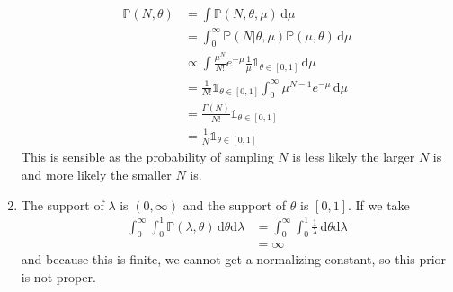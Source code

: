 \documentclass[letterpaper,10pt]{amsart}
\newcommand{\rmd}{\mathrm{d}}
\newcommand{\p}[1]{\mathbb{P}\!\left(#1\right)}
\begin{document}
\begin{enumerate}[{1}.1]
\begin{align*}
\p{N, \theta} &= \int \! \p{N, \theta, \mu} \, \rmd \mu \\
&= \int_0^\infty \! \p{N | \theta, \mu} \p{\mu, \theta} \, \rmd \mu \\
&\propto \int \! \frac{\mu^N}{N!}e^{-\mu} \frac{1}{\mu}  \mathds{1}_{\theta \in [0,1]} \, \rmd \mu\\
&= \frac{1}{N!} \mathds{1}_{\theta \in [0,1]} \int_0^\infty \! \mu^{N-1} e^{-\mu} \, \rmd \mu\\
&= \frac{\Gamma(N)}{N!} \mathds{1}_{\theta \in [0,1]}\\
&= \frac{1}{N} \mathds{1}_{\theta \in [0,1]}
\end{align*}
This is sensible as the probability of sampling $N$ is less likely the larger $N$ is and more likely the smaller $N$ is. 

\item The support of $\lambda$ is $(0,\infty)$ and the support of $\theta$ is $[0,1]$. If we take
\begin{align*}
\int_0^\infty \int_0^1 \! \p{\lambda, \theta} \, \rmd \theta \rmd \lambda &= \int_0^\infty \int_0^1 \! \frac{1}{\lambda} \, \rmd \theta \rmd \lambda\\ 
&= \infty
\end{align*}
and because this is finite, we cannot get a normalizing constant, so this prior is not proper.



\end{enumerate}
\end{document}
